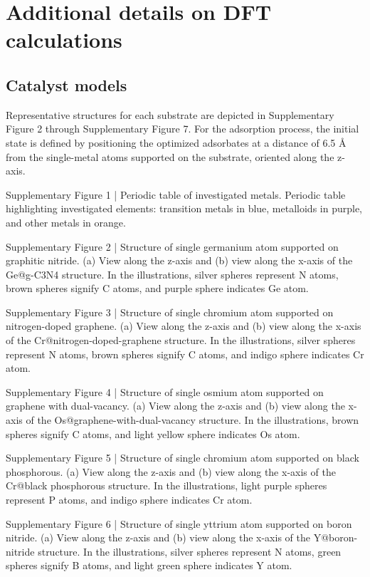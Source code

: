 

\section{Additional details on DFT calculations}


\subsection{Catalyst models}
Representative structures for each substrate are depicted in Supplementary Figure 2 through Supplementary Figure 7. For the adsorption process, the initial state is defined by positioning the optimized adsorbates at a distance of 6.5 Å from the single-metal atoms supported on the substrate, oriented along the z-axis.


Supplementary Figure 1 | Periodic table of investigated metals. Periodic table highlighting investigated elements: transition metals in blue, metalloids in purple, and other metals in orange.


Supplementary Figure 2 | Structure of single germanium atom supported on graphitic nitride. (a) View along the z-axis and (b) view along the x-axis of the Ge@g-C3N4 structure. In the illustrations, silver spheres represent N atoms, brown spheres signify C atoms, and purple sphere indicates Ge atom.


Supplementary Figure 3 | Structure of single chromium atom supported on nitrogen-doped graphene. (a) View along the z-axis and (b) view along the x-axis of the Cr@nitrogen-doped-graphene structure. In the illustrations, silver spheres represent N atoms, brown spheres signify C atoms, and indigo sphere indicates Cr atom.


Supplementary Figure 4 | Structure of single osmium atom supported on graphene with dual-vacancy. (a) View along the z-axis and (b) view along the x-axis of the Os@graphene-with-dual-vacancy structure. In the illustrations, brown spheres signify C atoms, and light yellow sphere indicates Os atom.


Supplementary Figure 5 | Structure of single chromium atom supported on black phosphorous. (a) View along the z-axis and (b) view along the x-axis of the Cr@black phosphorous structure. In the illustrations, light purple spheres represent P atoms, and indigo sphere indicates Cr atom.


Supplementary Figure 6 | Structure of single yttrium atom supported on boron nitride. (a) View along the z-axis and (b) view along the x-axis of the Y@boron-nitride structure. In the illustrations, silver spheres represent N atoms, green spheres signify B atoms, and light green sphere indicates Y atom.


